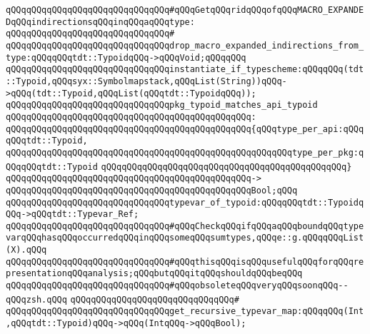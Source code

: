 \newline
\verb|qQQqqQQqqQQqqQQqqQQqqQQqqQQqqQQq#qQQqGetqQQqridqQQqofqQQqMACRO_EXPANDEDqQQqindirectionsqQQqinqQQqaqQQqtype:|\newline
\verb|qQQqqQQqqQQqqQQqqQQqqQQqqQQqqQQq#|\newline
\verb|qQQqqQQqqQQqqQQqqQQqqQQqqQQqqQQqdrop_macro_expanded_indirections_from_type:qQQqqQQqtdt::TypoidqQQq->qQQqVoid;qQQqqQQq|\newline
\newline
\newline
\verb|qQQqqQQqqQQqqQQqqQQqqQQqqQQqqQQqinstantiate_if_typescheme:qQQqqQQq(tdt::Typoid,qQQqsyx::Symbolmapstack,qQQqList(String))qQQq->qQQq(tdt::Typoid,qQQqList(qQQqtdt::TypoidqQQq));|\newline
\newline
\verb|qQQqqQQqqQQqqQQqqQQqqQQqqQQqqQQqpkg_typoid_matches_api_typoid|\newline
\verb|qQQqqQQqqQQqqQQqqQQqqQQqqQQqqQQqqQQqqQQqqQQqqQQq:|\newline
\verb|qQQqqQQqqQQqqQQqqQQqqQQqqQQqqQQqqQQqqQQqqQQqqQQq{qQQqtype_per_api:qQQqqQQqtdt::Typoid,|\newline
\verb|qQQqqQQqqQQqqQQqqQQqqQQqqQQqqQQqqQQqqQQqqQQqqQQqqQQqqQQqtype_per_pkg:qQQqqQQqtdt::Typoid|\newline
\verb|qQQqqQQqqQQqqQQqqQQqqQQqqQQqqQQqqQQqqQQqqQQqqQQq}|\newline
\verb|qQQqqQQqqQQqqQQqqQQqqQQqqQQqqQQqqQQqqQQqqQQqqQQq->|\newline
\verb|qQQqqQQqqQQqqQQqqQQqqQQqqQQqqQQqqQQqqQQqqQQqqQQqBool;qQQq|\newline
\newline
\verb|qQQqqQQqqQQqqQQqqQQqqQQqqQQqqQQqtypevar_of_typoid:qQQqqQQqtdt::TypoidqQQq->qQQqtdt::Typevar_Ref;|\newline
\newline
\verb|qQQqqQQqqQQqqQQqqQQqqQQqqQQqqQQq#qQQqCheckqQQqifqQQqaqQQqboundqQQqtypevarqQQqhasqQQqoccurredqQQqinqQQqsomeqQQqsumtypes,qQQqe::g.qQQqqQQqList(X).qQQq|\newline
\verb|qQQqqQQqqQQqqQQqqQQqqQQqqQQqqQQq#qQQqthisqQQqisqQQqusefulqQQqforqQQqrepresentationqQQqanalysis;qQQqbutqQQqitqQQqshouldqQQqbeqQQq|\newline
\verb|qQQqqQQqqQQqqQQqqQQqqQQqqQQqqQQq#qQQqobsoleteqQQqveryqQQqsoonqQQq--qQQqzsh.qQQq|\newline
\verb|qQQqqQQqqQQqqQQqqQQqqQQqqQQqqQQq#|\newline
\verb|qQQqqQQqqQQqqQQqqQQqqQQqqQQqqQQqget_recursive_typevar_map:qQQqqQQq(Int,qQQqtdt::Typoid)qQQq->qQQq(IntqQQq->qQQqBool);|\newline
